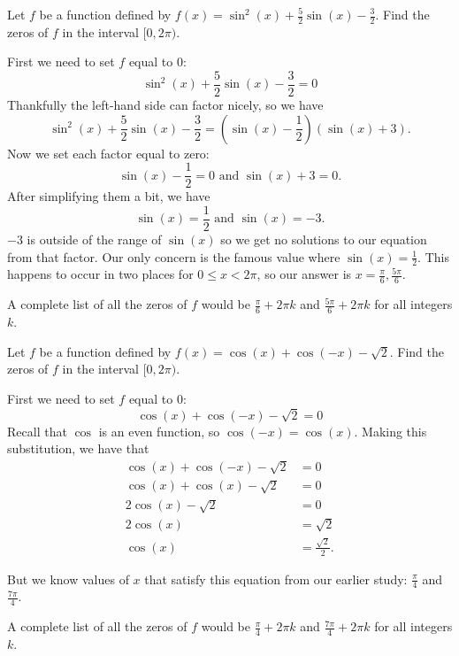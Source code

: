 \documentclass{ximera}
\begin{document}
\begin{example}
Let $f$ be a function defined by $f(x)=\sin^2(x)+\frac{5}{2}\sin(x)-\frac{3}{2}$. Find the zeros of $f$ in the interval $[0, 2\pi)$.
\begin{explanation}
First we need to set $f$ equal to $0$:\\
$$\sin^2(x)+\frac{5}{2}\sin(x)-\frac{3}{2}=0$$
Thankfully the left-hand side can factor nicely, so we have\\
\[
\sin^2(x)+\frac{5}{2}\sin(x)-\frac{3}{2}= \left(\sin(x)-\frac{1}{2}\right)(\sin(x)+3).
\]
Now we set each factor equal to zero:
\[
\sin(x)-\frac{1}{2}=0 \text{ and } \sin(x)+3 =0.
\]
After simplifying them a bit, we have
\[
\sin(x) = \frac{1}{2} \text{ and } \sin(x)=-3.
\]
$-3$ is outside of the range of $\sin(x)$ so we get no solutions to our equation from that factor. Our only concern is the famous value where $\sin(x) = \frac{1}{2}$. This happens to occur in two places for $0\leq x < 2\pi$, so our answer is $x=\frac{\pi}{6},\frac{5\pi}{6}$.

A complete list of all the zeros of $f$ would be $\frac{\pi}{6} + 2\pi k$ and $\frac{5\pi}{6} + 2\pi k$ for all integers $k$. 
\end{explanation}
\end{example}

\begin{example}
Let $f$ be a function defined by $f(x)=\cos(x) + \cos(-x) - \sqrt{2}$. Find the zeros of $f$ in the interval $[0, 2\pi)$.
\begin{explanation}
First we need to set $f$ equal to $0$:
$$\cos(x) + \cos(-x) - \sqrt{2}=0$$
Recall that $\cos$ is an even function, so $\cos(-x) = \cos(x)$. Making this substitution, we have that 
\begin{align*}
\cos(x) + \cos(-x) - \sqrt{2} & = 0 \\
\cos(x) + \cos(x) - \sqrt{2} & = 0 \\
2\cos(x) - \sqrt{2} & = 0 \\
2\cos(x) & = \sqrt{2} \\
\cos(x) & = \frac{\sqrt{2}}{2}.
\end{align*}

But we know values of $x$ that satisfy this equation from our earlier study: $\frac{\pi}{4}$ and $\frac{7\pi}{4}$. 

A complete list of all the zeros of $f$ would be $\frac{\pi}{4} + 2\pi k$ and $\frac{7\pi}{4} + 2\pi k$ for all integers $k$. 
\end{explanation}
\end{example}
\end{document}
